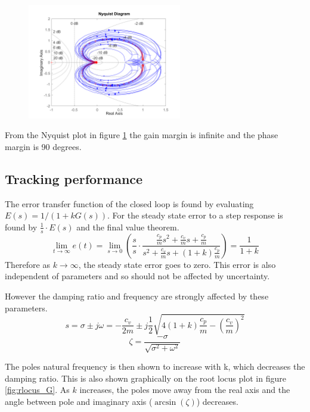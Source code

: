 \documentclass{article}
\begin{document}
\begin{figure}[H]
    \centering
    \includegraphics[width=0.6\textwidth]{figures/nyquist_G.png}
    \caption{}
    \label{fig:nyquist_G}
\end{figure}

From the Nyquist plot in figure \ref{fig:nyquist_G} the gain margin is infinite and the phase margin is 90 degrees.

\subsection{Tracking performance}


The error transfer function of the closed loop is found by evaluating $E(s) = 1/(1+kG(s))$.
For the steady state error to a step response is found by $\frac{1}{s} \cdot E(s)$ and the final value theorem.
\begin{equation}
    \lim_{t \to \infty} e(t) = \lim_{s \to 0} \left( \frac{s}{s} \cdot \frac{\frac{c_p}{m}s^2 + \frac{c_v}{m}s + \frac{c_p}{m}}{s^2 + \frac{c_v}{m}s + (1+k)\frac{c_p}{m}} \right) = \frac{1}{1+k}
\end{equation}
Therefore as $k \to \infty$, the steady state error goes to zero.
This error is also independent of parameters and so should not be affected by uncertainty.

However the damping ratio and frequency are strongly affected by these parameters.
\begin{equation}
    s = \sigma \pm j\omega = -\frac{c_v}{2m} \pm j \frac{1}{2} \sqrt{4(1+k)\frac{c_p}{m} - \left(\frac{c_v}{m}\right)^2}
\end{equation}
\begin{equation}
    \zeta = \frac{-\sigma }{ \sqrt{\sigma^2 + \omega^2}}
\end{equation}

The poles natural frequency is then shown to increase with k, which decreases the damping ratio.
This is also shown graphically on the root locus plot in figure \ref{fig:rlocus_G}.
As $k$ increases, the poles move away from the real axis and the angle between pole and imaginary axis ($\arcsin(\zeta)$) decreases.
\end{document}
